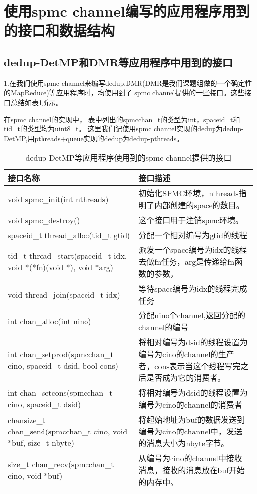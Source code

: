 \section{使用spmc channel编写的应用程序用到的接口和数据结构}
\subsection{dedup-DetMP和DMR等应用程序中用到的接口}
1.在我们使用spmc channel来编写dedup,DMR(DMR是我们课题组做的一个确定性的MapReduce)等应用程序时，均使用到了
spmc channel提供的一些接口。这些接口总结如表\ref{tab:DetMPInter}所示。

在spmc channel的实现中，
表中列出的spmcchan\_t的类型为int，spaceid\_t和tid\_t的类型均为uint8\_t。
这里我们记使用spmc channel实现的dedup为dedup-DetMP,用pthreads+queue实现的dedup为dedup-pthreads。
\begin{table}[!h]
\begin{footnotesize}
  \caption{dedup-DetMP等应用程序使用到的spmc channel提供的接口}
  \begin{tabularx}{1.0\textwidth}{|p{}|p{}|}
  \hline
  \textbf{接口名称} & \textbf{接口描述}\\
  \hline
  void spmc\_init(int nthreads) & 初始化SPMC环境，nthreads指明了内部创建的space的数目。\\
  \hline  
  void spmc\_destroy() &这个接口用于注销spmc环境。\\
  \hline
  spaceid\_t thread\_alloc(tid\_t gtid) & 分配一个相对编号为gtid的线程 \\
  \hline
  tid\_t thread\_start(spaceid\_t idx, void *(*fn)(void *), void *arg) & 
  派发一个space编号为idx的线程去做fn任务，arg是传递给fn函数的参数。\\
  \hline
  void thread\_join(spaceid\_t idx) & 等待space编号为idx的线程完成任务\\
  \hline
  int chan\_alloc(int nino)&分配nino个channel,返回分配的channel的编号\\
  \hline
  int chan\_setprod(spmcchan\_t cino, spaceid\_t dsid, bool cons) & 
  将相对编号为dsid的线程设置为编号为cino的channel的生产者，cons表示当这个线程写完之后是否成为它的消费者。\\
  \hline
  int chan\_setcons(spmcchan\_t cino, spaceid\_t dsid) & 
  将相对编号为dsid的线程设置为编号为cino的channel的消费者\\
  \hline
  chansize\_t chan\_send(spmcchan\_t cino, void *buf, size\_t nbyte)& 
  将起始地址为buf的数据发送到编号为cino的channel中，发送的消息大小为nbyte字节。\\
  \hline
  size\_t chan\_recv(spmcchan\_t cino, void *buf)& 
  从编号为cino的channel中接收消息，接收的消息放在buf开始的内存中。\\      
  \hline
 \end{tabularx}
\label{tab:DetMPInter}
\end{footnotesize}
\end{table}

